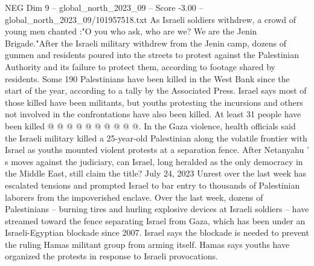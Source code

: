 \begin{textsample}{NEG Dim 9 – global\_north\_2023\_09 – Score -3.00 – global\_north\_2023\_09/101957518.txt}
As Israeli soldiers withdrew, a crowd of young men chanted :"O you who ask, who are we?
We are the Jenin Brigade."After the Israeli military withdrew from the Jenin camp, dozens of gunmen and residents poured into the streets to protest against the Palestinian Authority and its failure to protect them, according to footage shared by residents.
Some 190 Palestinians have been killed in the West Bank since the start of the year, according to a tally by the Associated Press.
Israel says most of those killed have been militants, but youths protesting the incursions and others not involved in the confrontations have also been killed.
At least 31 people have been killed @ @ @ @ @ @ @ @ @ @.
In the Gaza violence, health officials said the Israeli military killed a 25-year-old Palestinian along the volatile frontier with Israel as youths mounted violent protests at a separation fence.
After Netanyahu ' s moves against the judiciary, can Israel, long heralded as the only democracy in the Middle East, still claim the title?
July 24, 2023 Unrest over the last week has escalated tensions and prompted Israel to bar entry to thousands of Palestinian laborers from the impoverished enclave.
Over the last week, dozens of Palestinians -- burning tires and hurling explosive devices at Israeli soldiers -- have streamed toward the fence separating Israel from Gaza, which has been under an Israeli-Egyptian blockade since 2007.
Israel says the blockade is needed to prevent the ruling Hamas militant group from arming itself.
Hamas says youths have organized the protests in response to Israeli provocations.

\end{textsample}
